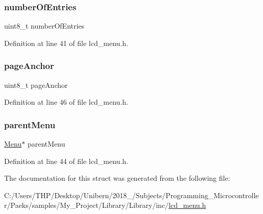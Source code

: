 \mbox{\label{struct_menu___a4f106d3cb8ba7865c1972731deaf6d45}} 
\subsubsection{\texorpdfstring{number\+Of\+Entries}{numberOfEntries}}
{\footnotesize\ttfamily uint8\+\_\+t number\+Of\+Entries}



Definition at line 41 of file lcd\+\_\+menu.\+h.

\mbox{\label{struct_menu___ade32708e7d25a18c52ef9ea43022157e}} 
\subsubsection{\texorpdfstring{page\+Anchor}{pageAnchor}}
{\footnotesize\ttfamily uint8\+\_\+t page\+Anchor}



Definition at line 46 of file lcd\+\_\+menu.\+h.

\mbox{\label{struct_menu___af153fe0e8d7a80232bc537bd3d99d14a}} 
\subsubsection{\texorpdfstring{parent\+Menu}{parentMenu}}
{\footnotesize\ttfamily \mbox{\hyperlink{lcd__menu_8h_afe0ab1c0311f677767b1588296b0f563}{Menu}}$\ast$ parent\+Menu}



Definition at line 44 of file lcd\+\_\+menu.\+h.



The documentation for this struct was generated from the following file\+:\begin{DoxyCompactItemize}
\item 
C\+:/\+Users/\+T\+H\+P/\+Desktop/\+Unibern/2018\+\_/\+Subjects/\+Programming\+\_\+\+Microcontroller/\+Paeks/samples/\+My\+\_\+\+Project/\+Library/\+Library/inc/\mbox{\hyperlink{lcd__menu_8h}{lcd\+\_\+menu.\+h}}\end{DoxyCompactItemize}
